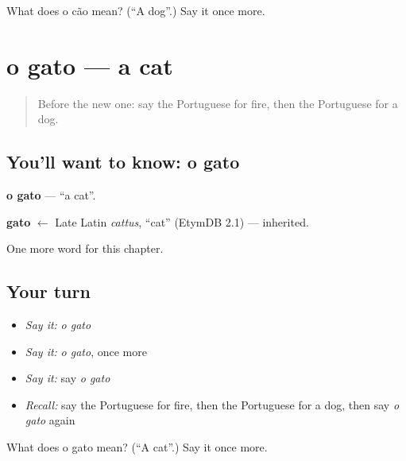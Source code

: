\begin{tcolorbox}[breakable,colback=teal!4,colframe=teal!35!black,title={Before you move on}]
What does o cão mean? (\textquotedblleft{}A dog\textquotedblright{}.) Say it once more.
\end{tcolorbox}
\section[o gato]{o gato — a cat}

\label{lesson:PT-C60-gato}



\begin{quote}
Before the new one: say the Portuguese for fire, then the Portuguese for a dog.
\end{quote}

\subsection*{You'll want to know: o gato}
\textbf{o gato} — \textquotedblleft{}a cat\textquotedblright{}.

\begin{cousinweb}
\textbf{gato} $\leftarrow$ Late Latin \emph{cattus}, \textquotedblleft{}cat\textquotedblright{} (EtymDB 2.1) — inherited.
\end{cousinweb}

\begin{grammarlens}[title={What you've built}]
One more word for this chapter.
\end{grammarlens}

\subsection*{Your turn}
\begin{itemize}
\raggedright
  \item \emph{Say it:} \emph{o gato}
  \item \emph{Say it:} \emph{o gato}, once more
  \item \emph{Say it:} say \emph{o gato}
  \item \emph{Recall:} say the Portuguese for fire, then the Portuguese for a dog, then say \emph{o gato} again
\end{itemize}

\begin{tcolorbox}[breakable,colback=teal!4,colframe=teal!35!black,title={Before you move on}]
What does o gato mean? (\textquotedblleft{}A cat\textquotedblright{}.) Say it once more.
\end{tcolorbox}
